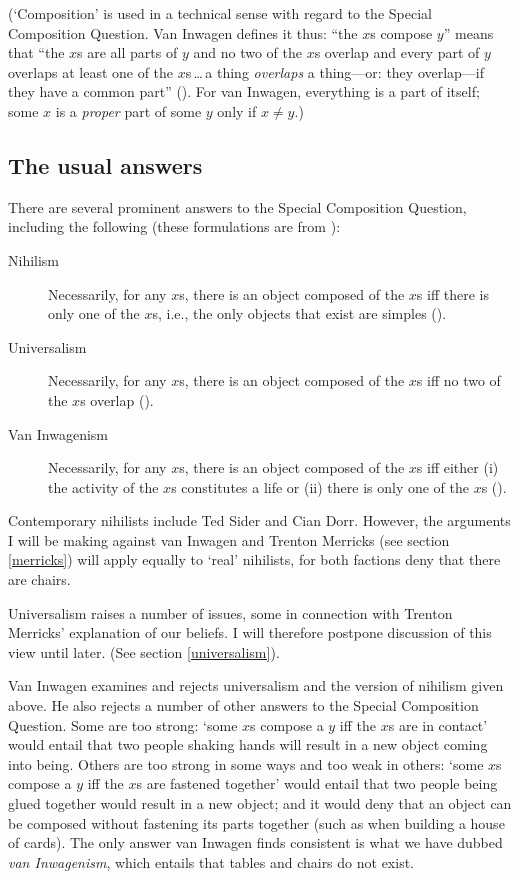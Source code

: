 \documentclass[11pt]{article}
\begin{document}
\begin{spacing}{1.5}
(`Composition' is used in a technical sense with regard to the Special
Composition Question.  Van Inwagen defines it thus: ``the $x$s compose
$y$'' means that ``the $x$s are all parts of $y$ and no two of the
$x$s overlap and every part of $y$ overlaps at least one of the
$x$s\,\ldots\,a thing {\em overlaps} a thing---or: they overlap---if
they have a common part'' (\citeyear[29]{inwagen1995}).  For van
Inwagen, everything is a part of itself; some $x$ is a {\em proper}
part of some $y$ only if $x \neq y$.)

\subsection{The usual answers}
\label{scq-ans}
There are several prominent answers to the Special Composition
Question, including the following (these formulations are from
\citet{markosian1998a}):
\begin{description}
	\item[Nihilism] Necessarily, for any $x$s, there is an object
          composed of the $x$s iff there is only one of the $x$s,
          i.e., the only objects that exist are
          simples (\citeyear[219]{markosian1998a}).%
	\item[Universalism] Necessarily, for any $x$s, there is an
          object composed of the $x$s iff no two of the $x$s overlap
          (\citeyear[227]{markosian1998a}).
	\item[Van Inwagenism] Necessarily, for any $x$s, there is an
          object composed of the $x$s iff either (i) the activity of
          the $x$s constitutes a life or (ii) there is only one of the
          $x$s (\citeyear[221]{markosian1998a}).
\end{description}

Contemporary nihilists include Ted Sider and Cian Dorr.  However, the
arguments I will be making against van Inwagen and Trenton Merricks
(see section \ref{merricks}) will apply equally to `real' nihilists,
for both factions deny that there are chairs.

Universalism raises a number of issues, some in connection with
Trenton Merricks' explanation of our beliefs.  I will therefore
postpone discussion of this view until later.  (See section
\ref{universalism}).

Van Inwagen examines and rejects universalism and the version of
nihilism given above.  He also rejects a number of other answers to
the Special Composition Question.  Some are too strong: `some $x$s
compose a $y$ iff the $x$s are in contact' would entail that two
people shaking hands will result in a new object coming into being.
Others are too strong in some ways and too weak in others: `some $x$s
compose a $y$ iff the $x$s are fastened together' would entail that
two people being glued together would result in a new object; and it
would deny that an object can be composed without fastening its parts
together (such as when building a house of cards).  The only answer
van Inwagen finds consistent is what we have dubbed {\em van
  Inwagenism}, which entails that tables and chairs do not exist.


\end{spacing}
\end{document}
